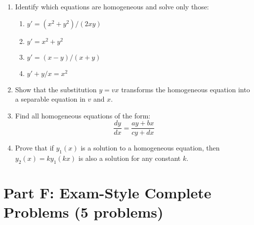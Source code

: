 \documentclass[12pt]{article}
\begin{document}
\begin{enumerate}[resume]
    \item Identify which equations are homogeneous and solve only those:
    \begin{enumerate}
        \item $y' = (x^2 + y^2)/(2xy)$
        \item $y' = x^2 + y^2$
        \item $y' = (x - y)/(x + y)$
        \item $y' + y/x = x^2$
    \end{enumerate}

    \item Show that the substitution $y = vx$ transforms the homogeneous equation into a separable equation in $v$ and $x$.

    \item Find all homogeneous equations of the form:
    $$\frac{dy}{dx} = \frac{ay + bx}{cy + dx}$$

    \item Prove that if $y_1(x)$ is a solution to a homogeneous equation, then $y_2(x) = ky_1(kx)$ is also a solution for any constant $k$.
\end{enumerate}

\section*{Part F: Exam-Style Complete Problems (5 problems)}
\end{document}
